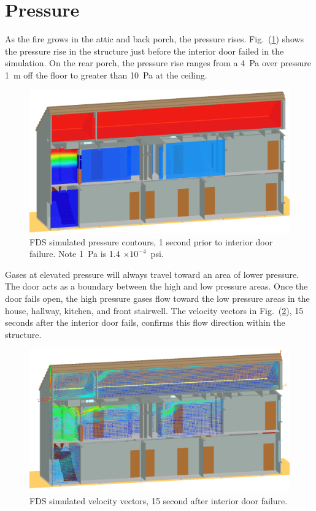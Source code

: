 \documentclass[11pt,oneside]{book}
\begin{document}
\section{Pressure}
As the fire grows in the attic and back porch, the pressure rises. Fig.~(\ref{fig:pres_159s}) shows the pressure rise in the structure just before the interior door failed in the simulation. On the rear porch, the pressure rise ranges from a 4~Pa over pressure 1~m off the floor to greater than 10~Pa at the ceiling.
\begin{figure}[!ht]
\includegraphics[width=.75\textwidth]{../Figures/west_50th_baseline_pres2}

\caption{FDS simulated pressure contours, 1 second prior to interior door failure. Note 1~Pa is 1.4 $\times 10 ^{-4}$~psi.}
\label{fig:pres_159s}
\end{figure}
Gases at elevated pressure will always travel toward an area of lower pressure. The door acts as a boundary between the high and low pressure areas. Once the door fails open, the high pressure gases flow toward the low pressure areas in the house, hallway, kitchen, and front stairwell. The velocity vectors in Fig.~(\ref{fig:velo_175s}), 15 seconds after the interior door fails, confirms this flow direction within the structure.
\begin{figure}[!ht]
\includegraphics[width=.675\textwidth]{../Figures/west_50th_baseline_velo_175}


\caption{FDS simulated velocity vectors, 15 second after interior door failure.}
\label{fig:velo_175s}
\end{figure}
\end{document}
